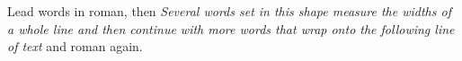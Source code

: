 \documentclass{article}
\begin{document}
Lead words in roman, then \textsf{\textit{Several words set in this shape measure the widths of a whole line and then continue with more words that wrap onto the following line of text}} and roman again.
\end{document}

